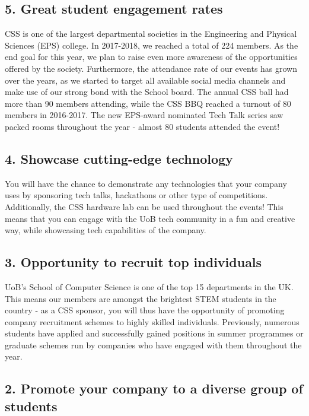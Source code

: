 \documentclass{article}
\begin{document}
\subsection*{5. Great student engagement rates}

CSS is one of the largest departmental societies in the Engineering and Physical Sciences (EPS) college. In 2017-2018, we reached a total of 224 members. As the end goal for this year, we plan to raise even more awareness of the opportunities offered by the society.
Furthermore, the attendance rate of our events has grown over the years, as we started to target all available social media channels and make use of our strong bond with the School board. 
The annual CSS ball had more than 90 members attending, while the CSS BBQ reached a turnout of 80 members in 2016-2017.  The new EPS-award nominated Tech Talk series saw packed rooms throughout the year - almost 80 students attended the event!

\subsection*{4. Showcase cutting-edge technology}

You will have the chance to demonstrate any technologies that your company uses by sponsoring tech talks, hackathons or other type of competitions. Additionally, the CSS hardware lab can be used throughout the events! 
This means that you can engage with the UoB tech community in a fun and creative way, while showcasing tech capabilities of the company.

\subsection*{3. Opportunity to recruit top individuals}

UoB’s School of Computer Science is one of the top 15 departments in the UK. 
This means our members are amongst the brightest STEM students in the country - as a CSS sponsor, you will thus have the opportunity of promoting company recruitment schemes to highly skilled individuals.
Previously, numerous students have applied and successfully gained positions in summer programmes or graduate schemes run by companies who have engaged with them throughout the year. 

\subsection*{2. Promote your company to a diverse group of students}
\end{document}
